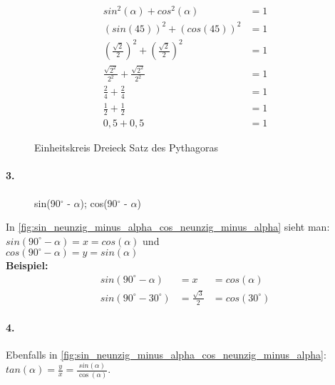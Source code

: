 \documentclass{standalone}
\begin{document}
\begin{align}
	sin^2(\alpha) + cos^2(\alpha)                   & = 1 \tag{1}  \\
	(sin(45))^2 + (cos(45))^2                       & = 1  \tag{2} \\
	(\frac{\sqrt{2}}{2})^2 + (\frac{\sqrt{2}}{2})^2 & = 1 \tag{3}  \\
	\frac{\sqrt{2^2}}{2^2} + \frac{\sqrt{2^2}}{2^2} & = 1 \tag{4}  \\
	\frac{2}{4} + \frac{2}{4}                       & = 1 \tag{5}  \\
	\frac{1}{2} + \frac{1}{2}                       & = 1 \tag{6}  \\
	0,5 + 0,5                                       & = 1 \tag{7}
\end{align}

\begin{figure}[hb!]
	\centering
	\def\svgwidth{200px}
	
	\caption{Einheitskreis Dreieck Satz des Pythagoras}
	\label{fig:einheitskreis_dreieck_pythagoras}
\end{figure}

\paragraph{3.}

\begin{wrapfigure}[6]{r}{0.45\textwidth}
	\def\svgwidth{200px}
	
	\caption{sin(90$^\circ$ - $\alpha$); cos(90$^\circ$ - $\alpha$)}
	\label{fig:sin_neunzig_minus_alpha_cos_neunzig_minus_alpha}
\end{wrapfigure}

In \autoref{fig:sin_neunzig_minus_alpha_cos_neunzig_minus_alpha} sieht man: \\
$sin(90^\circ - \alpha) = x = cos(\alpha)$ und \\
$cos(90^\circ - \alpha) = y = sin(\alpha)$ \\
\textbf{Beispiel:}
\begin{align}
	sin(90^\circ - \alpha)   & = x                   & = cos(\alpha) \tag{1}   \\
	sin(90^\circ - 30^\circ) & =  \frac{\sqrt{3}}{2} & = cos(30^\circ) \tag{2}
\end{align}

\paragraph{4.}

Ebenfalls in \autoref{fig:sin_neunzig_minus_alpha_cos_neunzig_minus_alpha}:\\
$tan(\alpha) = \frac{y}{x} = \frac{sin(\alpha)}{\cos(\alpha)}$.
\end{document}
